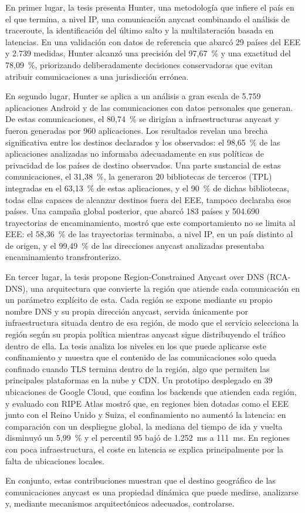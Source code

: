 En primer lugar, la tesis presenta Hunter, una metodología que infiere el país en el que termina, a nivel IP, una comunicación anycast combinando el análisis de traceroute, la identificación del último salto y la multilateración basada en latencias. En una validación con datos de referencia que abarcó 29 países del EEE y 2.739 medidas, Hunter alcanzó una precisión del 97,67~\% y una exactitud del 78,09~\%, priorizando deliberadamente decisiones conservadoras que evitan atribuir comunicaciones a una jurisdicción errónea.

En segundo lugar, Hunter se aplica a un análisis a gran escala de 5.759 aplicaciones Android y de las comunicaciones con datos personales que generan. De estas comunicaciones, el 80,74~\% se dirigían a infraestructuras anycast y fueron generadas por 960 aplicaciones. Los resultados revelan una brecha significativa entre los destinos declarados y los observados: el 98,65~\% de las aplicaciones analizadas no informaba adecuadamente en sus políticas de privacidad de los países de destino observados. Una parte sustancial de estas comunicaciones, el 31,38~\%, la generaron 20 bibliotecas de terceros (TPL) integradas en el 63,13~\% de estas aplicaciones, y el 90~\% de dichas bibliotecas, todas ellas capaces de alcanzar destinos fuera del EEE, tampoco declaraba esos países. Una campaña global posterior, que abarcó 183 países y 504.690 trayectorias de encaminamiento, mostró que este comportamiento no se limita al EEE: el 58,36~\% de las trayectorias terminaba, a nivel IP, en un país distinto al de origen, y el 99,49~\% de las direcciones anycast analizadas presentaba encaminamiento transfronterizo.

En tercer lugar, la tesis propone Region-Constrained Anycast over DNS (RCA-DNS), una arquitectura que convierte la región que atiende cada comunicación en un parámetro explícito de esta. Cada región se expone mediante su propio nombre DNS y su propia dirección anycast, servida únicamente por infraestructura situada dentro de esa región, de modo que el servicio selecciona la región según su propia política mientras anycast sigue distribuyendo el tráfico dentro de ella. La tesis analiza los niveles en los que puede aplicarse este confinamiento y muestra que el contenido de las comunicaciones solo queda confinado cuando TLS termina dentro de la región, algo que permiten las principales plataformas en la nube y CDN. Un prototipo desplegado en 39 ubicaciones de Google Cloud, que confina los backends que atienden cada región, y evaluado con RIPE Atlas mostró que, en regiones bien dotadas como el EEE junto con el Reino Unido y Suiza, el confinamiento no aumentó la latencia: en comparación con un despliegue global, la mediana del tiempo de ida y vuelta disminuyó un 5,99~\% y el percentil 95 bajó de 1.252~ms a 111~ms. En regiones con poca infraestructura, el coste en latencia se explica principalmente por la falta de ubicaciones locales.

En conjunto, estas contribuciones muestran que el destino geográfico de las comunicaciones anycast es una propiedad dinámica que puede medirse, analizarse y, mediante mecanismos arquitectónicos adecuados, controlarse.
